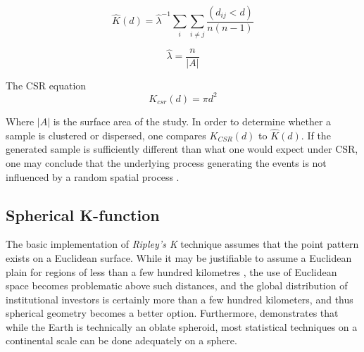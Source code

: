 \begin{equation}
\hat{K}(d) = \hat{\lambda}^{-1}\sum_{i}\sum_{i \neq j}\dfrac{(d_{ij} < d)}{n(n-1)}
\end{equation}

\begin{equation}
    \hat{\lambda} = \dfrac{n}{|A|}
\end{equation}

The CSR equation
\begin{equation}
    K_{csr}(d) = \pi d^{2}
    \label{eq:csr}
\end{equation}

Where $|A|$ is the surface area of the study.  In order to determine whether a sample is clustered or dispersed, one compares $K_{CSR}(d)$ to $\hat{K}(d)$.  If the generated sample is sufficiently different than what one would expect under CSR, one may conclude that the underlying process generating the events is not influenced by a random spatial process \citep{brunsdon2015introduction}. 

\subsection{Spherical K-function}

The basic implementation of \textit{Ripley's K} technique assumes that the point pattern exists on a Euclidean surface.  While it may be justifiable to assume a Euclidean plain for regions of less than a few hundred kilometres \citep{HeatherJ.Lynch2008,wilschut2015spatial},  the use of Euclidean space becomes problematic above such distances, and the global distribution of institutional investors is certainly more than a few hundred kilometers, and thus spherical geometry becomes a better option. Furthermore, \cite{Tobler2002} demonstrates that while the Earth is technically an oblate spheroid, most statistical techniques on a continental scale can be done adequately on a sphere.  

